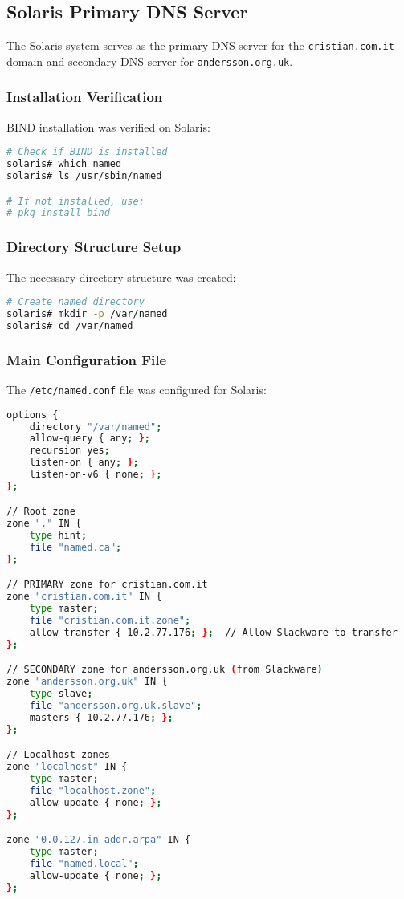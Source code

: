 \documentclass[12pt,a4paper]{article}
\begin{document}
\subsection{Solaris Primary DNS Server}\label{subsec:solaris-dns}

The Solaris system serves as the primary DNS server for the \texttt{cristian.com.it} domain and secondary DNS server for \texttt{andersson.org.uk}.

\subsubsection{Installation Verification}
BIND installation was verified on Solaris:

\begin{lstlisting}[language=bash, caption=Verifying BIND on Solaris]
# Check if BIND is installed
solaris# which named
solaris# ls /usr/sbin/named

# If not installed, use:
# pkg install bind
\end{lstlisting}

\subsubsection{Directory Structure Setup}
The necessary directory structure was created:

\begin{lstlisting}[language=bash, caption=Creating Directory Structure]
# Create named directory
solaris# mkdir -p /var/named
solaris# cd /var/named
\end{lstlisting}

\subsubsection{Main Configuration File}
The \texttt{/etc/named.conf} file was configured for Solaris:

\begin{lstlisting}[language=bash, caption=Solaris named.conf Configuration]
options {
    directory "/var/named";
    allow-query { any; };
    recursion yes;
    listen-on { any; };
    listen-on-v6 { none; };
};

// Root zone
zone "." IN {
    type hint;
    file "named.ca";
};

// PRIMARY zone for cristian.com.it
zone "cristian.com.it" IN {
    type master;
    file "cristian.com.it.zone";
    allow-transfer { 10.2.77.176; };  // Allow Slackware to transfer
};

// SECONDARY zone for andersson.org.uk (from Slackware)
zone "andersson.org.uk" IN {
    type slave;
    file "andersson.org.uk.slave";
    masters { 10.2.77.176; };
};

// Localhost zones
zone "localhost" IN {
    type master;
    file "localhost.zone";
    allow-update { none; };
};

zone "0.0.127.in-addr.arpa" IN {
    type master;
    file "named.local";
    allow-update { none; };
};
\end{lstlisting}
\end{document}
